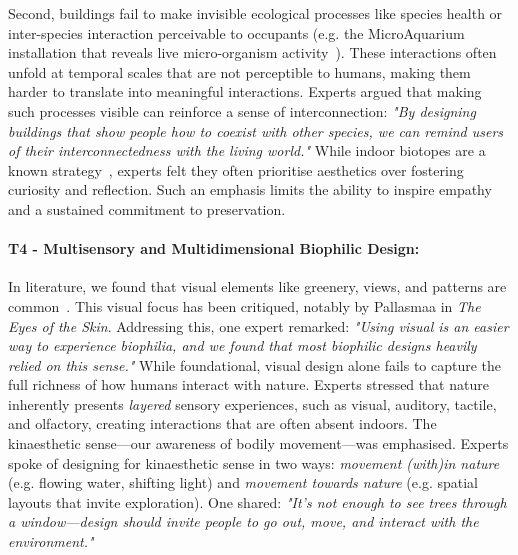 Second, buildings fail to make invisible ecological processes like species health or inter-species interaction perceivable to occupants (e.g. the MicroAquarium installation that reveals live micro-organism activity~\cite{lee2020microaquarium}). These interactions often unfold at temporal scales that are not perceptible to humans, making them harder to translate into meaningful interactions. Experts argued that making such processes visible can reinforce a sense of interconnection: \textit{"By designing buildings that show people how to coexist with other species, we can remind users of their interconnectedness with the living world."} While indoor biotopes are a known strategy~\cite{kerimova2012biotope}, experts felt they often prioritise aesthetics over fostering curiosity and reflection. Such an emphasis limits the ability to inspire empathy and a sustained commitment to preservation.


\paragraph{T4 - Multisensory and Multidimensional Biophilic Design:}
\label{theme:t4}
In literature, we found that visual elements like greenery, views, and patterns are common~\cite{beatley2016handbook, lefosse2023biophilia}. This visual focus has been critiqued, notably by Pallasmaa in \emph{The Eyes of the Skin}. Addressing this, one expert remarked: \textit{"Using visual is an easier way to experience biophilia, and we found that most biophilic designs heavily relied on this sense."} While foundational, visual design alone fails to capture the full richness of how humans interact with nature. Experts stressed that nature inherently presents \textit{layered} sensory experiences, such as visual, auditory, tactile, and olfactory, creating interactions that are often absent indoors. The kinaesthetic sense---our awareness of bodily movement---was emphasised. Experts spoke of designing for kinaesthetic sense in two ways: \textit{movement (with)in nature} (e.g. flowing water, shifting light) and \textit{movement towards nature} (e.g. spatial layouts that invite exploration). One shared:  \textit{"It’s not enough to see trees through a window---design should invite people to go out, move, and interact with the environment."}

